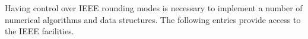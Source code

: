 \documentclass[../Dictionary.tex]{subfiles}
\begin{document}
\label{sect:rounding}

Having control over IEEE rounding modes is necessary to implement a
number of numerical algorithms and data structures. The following
entries provide access to the IEEE facilities.







\end{document}

